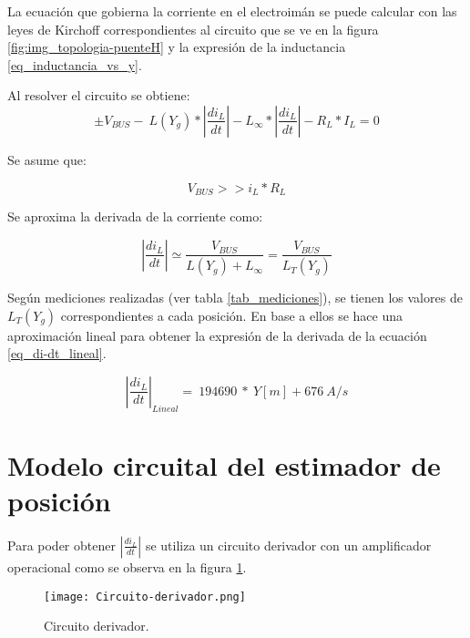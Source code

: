 \noindent La ecuaci\'{o}n que gobierna la corriente en el electroim\'{a}n se puede calcular con las leyes de Kirchoff correspondientes al circuito que se ve en la figura \ref{fig:img_topologia-puenteH} y la expresión de la inductancia \ref{eq_inductancia_vs_y}.


\noindent Al resolver el circuito se obtiene:
\begin{equation} \label{eq_VbusCondicion}
	\pm V_{BUS}-\ L(Y_g)*\left|\frac{{di}_L}{dt}\right|-L_{\infty }*\left|\frac{{di}_L}{dt}\right|-R_L*I_L=0
\end{equation}


\noindent Se asume que:

\begin{equation} \label{eq_Derivadadi-dt}
	V_{BUS}>>i_L*R_L
\end{equation}
 
\noindent Se aproxima la derivada de la corriente como:

\begin{equation} \label{eq_derivadaAproximacion}
	\left|\frac{{di}_L}{dt}\right|\simeq \frac{V_{BUS}}{L(Y_g)+L_{\infty }}=\frac{V_{BUS}}{L_T(Y_g)}
\end{equation}

\noindent Según mediciones realizadas (ver tabla \ref{tab_mediciones}), se tienen los valores de $L_T(Y_g)$ correspondientes a cada posici\'{o}n. En base a ellos se hace una aproximaci\'{o}n lineal para obtener la expresi\'{o}n de la derivada de la ecuaci\'{o}n \ref{eq_di-dt_lineal}.

\noindent 

\begin{equation} \label{eq_di-dt_lineal}
{\left|\frac{{di}_L}{dt}\right|}_{Lineal}=\ 194690\ *\ Y[m]+676\ A/s
\end{equation}

\section{Modelo circuital del estimador de posici\'{o}n}

\noindent Para poder obtener $\left|\frac{{di}_L}{dt}\right|$ se utiliza un circuito derivador con un amplificador operacional como se observa en la figura  \ref{fig:img_Circuito-derivador}.

\begin{figure}[H]
	\centering
	\texttt{[image: Circuito-derivador.png]}
	\caption{Circuito derivador.}
	\label{fig:img_Circuito-derivador}
\end{figure}

